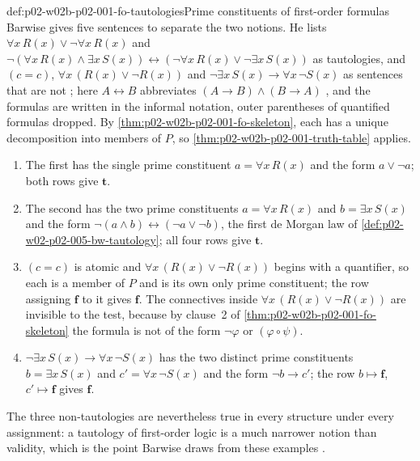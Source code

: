\begin{hbexample}{def:p02-w02b-p02-001-fo-tautologies}{Prime constituents of first-order formulas}
Barwise gives five sentences to separate the two notions.  He lists
\(\forall x\,R(x)\lor\neg\forall x\,R(x)\) and
\(\neg(\forall x\,R(x)\land\exists x\,S(x))\leftrightarrow
(\neg\forall x\,R(x)\lor\neg\exists x\,S(x))\) as tautologies, and
\((c=c)\), \(\forall x\,(R(x)\lor\neg R(x))\) and
\(\neg\exists x\,S(x)\to\forall x\,\neg S(x)\) as sentences that are not
\cite[ch.~A.1, \S4, p.~28]{Barwise1977FirstOrder}; here
\(A\leftrightarrow B\) abbreviates \((A\to B)\land(B\to A)\)
\cite[ch.~A.1, \S4, p.~25]{Barwise1977FirstOrder}, and the formulas are
written in the informal notation, outer parentheses of quantified formulas
dropped.  By \cref{thm:p02-w02b-p02-001-fo-skeleton}, each has a unique
decomposition into members of \(P\), so
\cref{thm:p02-w02b-p02-001-truth-table} applies.
\begin{enumerate}
\item The first has the single prime constituent \(a=\forall x\,R(x)\) and
      the form \(a\lor\neg a\); both rows give \(\mathbf t\).
\item The second has the two prime constituents \(a=\forall x\,R(x)\) and
      \(b=\exists x\,S(x)\) and the form
      \(\neg(a\land b)\leftrightarrow(\neg a\lor\neg b)\), the first de
      Morgan law of \cref{def:p02-w02-p02-005-bw-tautology}; all four rows
      give \(\mathbf t\).
\item \((c=c)\) is atomic and \(\forall x\,(R(x)\lor\neg R(x))\) begins with a
      quantifier, so each is a member of \(P\) and is its own only prime
      constituent; the row assigning \(\mathbf f\) to it gives
      \(\mathbf f\).  The connectives inside \(\forall x\,(R(x)\lor\neg R(x))\)
      are invisible to the test, because by clause~2 of
      \cref{thm:p02-w02b-p02-001-fo-skeleton} the formula is not of the
      form \(\neg\varphi\) or \((\varphi\circ\psi)\).
\item \(\neg\exists x\,S(x)\to\forall x\,\neg S(x)\) has the two distinct
      prime constituents \(b=\exists x\,S(x)\) and
      \(c'=\forall x\,\neg S(x)\) and the form \(\neg b\to c'\); the row
      \(b\mapsto\mathbf f\), \(c'\mapsto\mathbf f\) gives \(\mathbf f\).
\end{enumerate}
The three non-tautologies are nevertheless true in every structure under
every assignment: a tautology of first-order logic is a much narrower
notion than validity, which is the point Barwise draws from these examples
\cite[ch.~A.1, \S4, p.~28]{Barwise1977FirstOrder}.
\end{hbexample}

